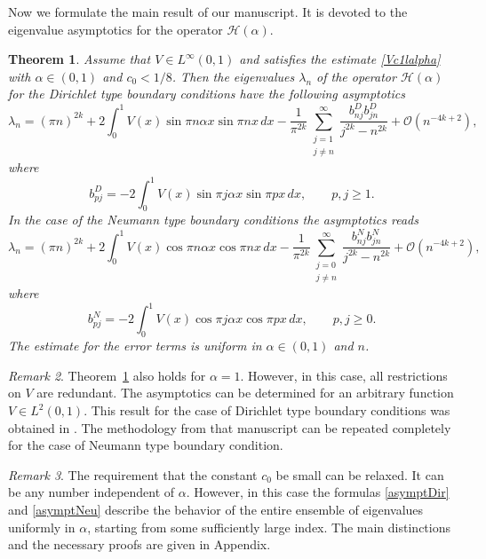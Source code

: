 \documentclass[11pt,centertags,reqno,twoside]{amsart}
\numberwithin{equation}{section}
\newtheorem{theorem}{Theorem}
\theoremstyle{definition}
\theoremstyle{remark}
\newtheorem{remark}[theorem]{Remark}
\begin{document}
Now we formulate the main result of our manuscript. It is devoted to the eigenvalue
asymptotics for the operator $\mathcal{H}(\alpha)$.
\begin{theorem}\label{th1}
Assume that $V\in L^\infty(0, 1)$ and satisfies the estimate \eqref{Vc1lalpha}
with $\alpha\in (0, 1)$ and $c_0<1/8$. Then
the eigenvalues $\lambda_n$ of the operator $\mathcal{H}(\alpha)$ for the Dirichlet type boundary conditions
have the following asymptotics
\begin{equation}\label{asymptDir}
\lambda_n=(\pi n)^{2k}+2\int_0^1V(x)\sin\pi n\alpha x\sin \pi nx\,dx
-\frac{1}{\pi^{2k}}\sum\limits_{\substack{j=1 \\ j\ne n}}^\infty
\frac{b_{nj}^Db_{jn}^D}{j^{2k}-n^{2k}}+\mathcal{O}(n^{-4k+2}),
\end{equation}
where
\begin{equation}\label{bnjD}
b_{pj}^D=-2\int_0^1V(x)\sin\pi j\alpha x\sin \pi px\,dx, \qquad p, j\geqslant 1.
\end{equation}
In the case of the Neumann type boundary conditions the asymptotics reads
\begin{equation}\label{asymptNeu}
\lambda_n=(\pi n)^{2k}+2\int_0^1V(x)\cos\pi n\alpha x\cos\pi nx\,dx
-\frac{1}{\pi^{2k}}\sum\limits_{\substack{j=0 \\ j\ne n}}^\infty
\frac{b_{nj}^Nb_{jn}^N}{j^{2k}-n^{2k}}+\mathcal{O}(n^{-4k+2}),
\end{equation}
where
\begin{equation}\label{bnjN}
b_{pj}^N=-2\int_0^1V(x)\cos\pi j\alpha x\cos\pi px\,dx, \qquad p, j\geqslant 0.
\end{equation}
The estimate for the error terms is uniform in $\alpha\in (0, 1)$ and $n$.
\end{theorem}
\begin{remark}
Theorem~\ref{th1} also holds for $\alpha=1$. However, in this case, all
restrictions on $V$ are redundant. The asymptotics can be determined
for an arbitrary function $V\in L^2(0, 1)$. This result for the case of Dirichlet type
boundary conditions was obtained in \cite[Theorem~3]{PolyakovM2AS}.
The methodology from that manuscript can be repeated completely for the case
of Neumann type boundary condition.
\end{remark}
\begin{remark}\label{rem2}
The requirement that the constant $c_0$ be small can be relaxed. It can be any number
independent of $\alpha$. However, in this case the formulas \eqref{asymptDir} and
\eqref{asymptNeu} describe the behavior of the entire ensemble of eigenvalues
uniformly in $\alpha$, starting from some sufficiently large index.
The main distinctions and the necessary proofs are given in Appendix.
\end{remark}
\end{document}
